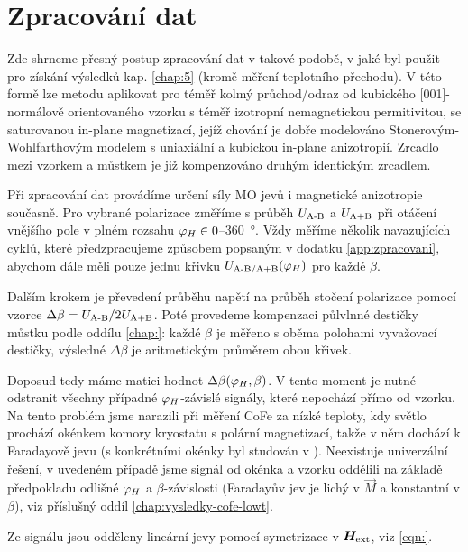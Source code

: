 \section{Zpracování dat}
\label{chap:zpracovani-dat}

Zde shrneme přesný postup zpracování dat v takové podobě, v jaké byl použit pro získání výsledků kap. \ref{chap:5} (kromě měření teplotního přechodu).
V této formě lze metodu aplikovat pro téměř kolmý průchod/odraz od kubického [001]-normálově orientovaného vzorku s téměř izotropní nemagnetickou permitivitou, se saturovanou in-plane magnetizací, jejíž chování je dobře modelováno Stonerovým-Wohlfarthovým modelem s uniaxiální a kubickou in-plane anizotropií.
Zrcadlo mezi vzorkem a můstkem je již kompenzováno druhým identickým zrcadlem.

Při zpracování dat provádíme určení síly MO jevů i magnetické anizotropie současně.
Pro vybrané polarizace změříme s průběh $U_\textrm{A-B}$ a $U_\textrm{A+B}$ při otáčení vnějšího pole v plném rozsahu $\varphi_H \in 0$--\SI{360}{\degree}.
Vždy měříme několik navazujících cyklů, které předzpracujeme způsobem popsaným v dodatku \ref{app:zpracovani}, abychom dále měli pouze jednu křivku $U_\textrm{A-B/A+B}(\varphi_H)$ pro každé $\beta$.

Dalším krokem je převedení průběhu napětí na průběh stočení polarizace pomocí vzorce $\Delta\beta=U_\textrm{A-B}/2U_\textrm{A+B}$.
Poté provedeme kompenzaci půlvlnné destičky můstku podle oddílu \ref{chap:}: každé $\beta$ je měřeno s oběma polohami vyvažovací destičky, výsledné $\Delta\beta$ je aritmetickým průměrem obou křivek.

Doposud tedy máme matici hodnot $\Delta\beta(\varphi_H, \beta)$.
V tento moment je nutné odstranit všechny případné $\varphi_H$-závislé signály, které nepochází přímo od vzorku.
Na tento problém jsme narazili při měření CoFe za nízké teploty, kdy světlo prochází okénkem komory kryostatu s polární magnetizací, takže v něm dochází k Faradayově jevu (s konkrétními okénky byl studován v \cite{baduraMagnetooptickaMereniPro2019}).
Neexistuje univerzální řešení, v uvedeném případě jsme signál od okénka a vzorku oddělili na základě předpokladu odlišné $\varphi_H$ a $\beta$-závislosti (Faradayův jev je lichý v $\vec{M}$ a konstantní v $\beta$), viz příslušný oddíl \ref{chap:vysledky-cofe-lowt}.

Ze signálu jsou odděleny lineární jevy pomocí symetrizace v $\bm{H}_\textrm{ext}$, viz \eqref{eqn:}.

